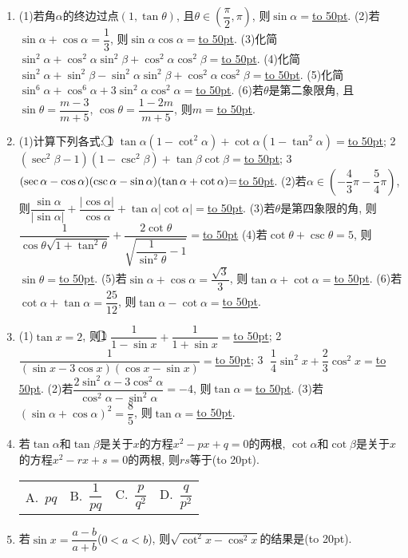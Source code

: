 \documentclass[10pt,a4paper]{article}
\newcommand{\blank}[1]{\underline{\hbox to #1pt{}}}
\newcommand{\bracket}[1]{(\hbox to #1pt{})}
\newcommand{\fourch}[4]{\par\begin{tabular}{p{.23\textwidth}p{.23\textwidth}p{.23\textwidth}p{.23\textwidth}}
A.~#1 &B.~#2& C.~#3& D.~#4
\end{tabular}}
\begin{document}
\begin{enumerate}[1.]
\fourch{$\{\alpha|0<\alpha <\pi\}$}{$\{\alpha|0<\alpha <\dfrac{\pi }2\pi <\alpha <\dfrac{3\pi }2\}$}{$\{\alpha|0<\alpha <\pi \alpha =\dfrac{3\pi }2\}$}{$\{\alpha|0<\alpha <\dfrac{\pi }2\dfrac{3\pi }2<\alpha <2\pi\}$}
\item (1)若角$\alpha$的终边过点$(1,\tan \theta)$, 且$\theta \in (\dfrac{\pi }2,\pi)$, 则$\sin \alpha =$\blank{50}.
(2)若$\sin \alpha +\cos \alpha =\dfrac 13$, 则$\sin \alpha \cos \alpha =$\blank{50}.
(3)化简$\sin ^2\alpha +\cos ^2\alpha \sin ^2\beta +\cos ^2\alpha \cos ^2\beta =$\blank{50}.
(4)化简$\sin ^2\alpha +\sin ^2\beta -\sin ^2\alpha \sin ^2\beta +\cos ^2\alpha \cos ^2\beta =$\blank{50}.
(5)化简$\sin ^6\alpha +\cos ^6\alpha +3\sin ^2\alpha \cos ^2\alpha =$\blank{50}.
(6)若$\theta$是第二象限角, 且$\sin \theta =\dfrac{m-3}{m+5}$, $\cos \theta =\dfrac{1-2m}{m+5}$, 则$m=$\blank{50}.
\item (1)计算下列各式:
\textcircled{1} $\tan \alpha (1-\cot ^2\alpha)+\cot \alpha (1-\tan ^2\alpha)=$\blank{50};
\textcircled{2} $(\sec ^2\beta -1)(1-\csc ^2\beta)+\tan \beta \cot \beta =$\blank{50};
\textcircled{3} $(\sec \alpha -\cos \alpha)(\csc \alpha -\sin \alpha)(\tan \alpha +\cot \alpha)\text=$\blank{50}.
(2)若$\alpha \in (-\dfrac 43\pi -\dfrac 54\pi)$, 则$\dfrac{\sin \alpha }{|\sin \alpha|}+\dfrac{|\cos \alpha|}{\cos \alpha }+\tan \alpha|\cot \alpha|=$\blank{50}.
(3)若$\theta$是第四象限的角, 则$\dfrac 1{\cos \theta \sqrt {1+\tan ^2\theta }}+\dfrac{2\cot \theta }{\sqrt {\dfrac 1{\sin ^2\theta }-1}}=$\blank{50}
(4)若$\cot \theta +\csc \theta =5$, 则$\sin \theta =$\blank{50}.
(5)若$\sin \alpha +\cos \alpha =\dfrac{\sqrt 3}3$, 则$\tan \alpha +\cot \alpha =$\blank{50}.
(6)若$\cot \alpha +\tan \alpha =\dfrac{25}{12}$, 则$\tan \alpha -\cot \alpha =$\blank{50}.
\item (1)$\tan x=2$, 则\textcircled{1} $\dfrac 1{1-\sin x}+\dfrac 1{1+\sin x}=$\blank{50};
\textcircled{2} $\dfrac 1{(\sin x-3\cos x)(\cos x-\sin x)}=$\blank{50};
\textcircled{3} $\dfrac 14\sin ^2x+\dfrac 23\cos ^2x=$\blank{50}.
(2)若$\dfrac{2\sin ^2\alpha -3\cos ^2\alpha }{\cos ^2\alpha -\sin ^2\alpha }=-4$, 则$\tan \alpha =$\blank{50}.
(3)若$(\sin \alpha +\cos \alpha)^2=\dfrac 85$, 则$\tan \alpha =$\blank{50}.
\item 若$\tan \alpha$和$\tan \beta$是关于$x$的方程$x^2-px+q=0$的两根, $\cot \alpha$和$\cot \beta$是关于$x$的方程$x^2-rx+s=0$的两根, 则$rs$等于\bracket{20}.
\fourch{$pq$}{$\dfrac 1{pq}$}{$\dfrac p{q^2}$}{$\dfrac q{p^2}$}
\item 若$\sin x=\dfrac{a-b}{a+b}$($0<a<b$), 则$\sqrt {\cot ^2x-\cos ^2x}$的结果是\bracket{20}.

\end{enumerate}
\end{document}
